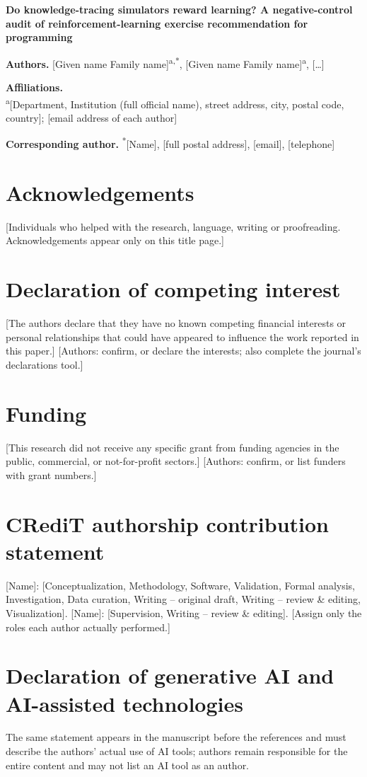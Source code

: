 \documentclass[12pt]{article}
\begin{document}
{\Large\bfseries Do knowledge-tracing simulators reward learning? A negative-control audit of reinforcement-learning exercise recommendation for programming\par}

\bigskip
\textbf{Authors.} [Given name Family name]\textsuperscript{a,*}, [Given name Family name]\textsuperscript{a}, [\ldots]

\textbf{Affiliations.}\\
\textsuperscript{a}[Department, Institution (full official name), street address, city, postal code, country]; [email address of each author]

\textbf{Corresponding author.} \textsuperscript{*}[Name], [full postal address], [email], [telephone]

\section*{Acknowledgements}
[Individuals who helped with the research, language, writing or proofreading. Acknowledgements appear only on this title page.]

\section*{Declaration of competing interest}
[The authors declare that they have no known competing financial interests or personal relationships that could have appeared to influence the work reported in this paper.] [Authors: confirm, or declare the interests; also complete the journal's declarations tool.]

\section*{Funding}
[This research did not receive any specific grant from funding agencies in the public, commercial, or not-for-profit sectors.] [Authors: confirm, or list funders with grant numbers.]

\section*{CRediT authorship contribution statement}
[Name]: [Conceptualization, Methodology, Software, Validation, Formal analysis, Investigation, Data curation, Writing -- original draft, Writing -- review \& editing, Visualization]. [Name]: [Supervision, Writing -- review \& editing]. [Assign only the roles each author actually performed.]

\section*{Declaration of generative AI and AI-assisted technologies}
The same statement appears in the manuscript before the references and must describe the authors' actual use of AI tools; authors remain responsible for the entire content and may not list an AI tool as an author.
\end{document}
